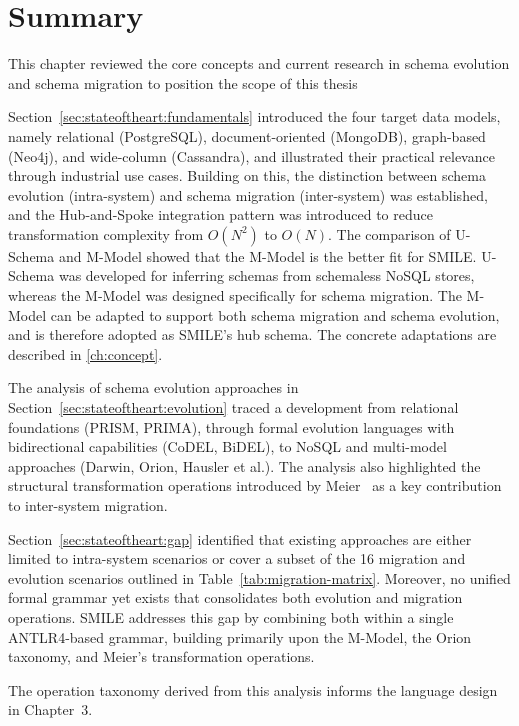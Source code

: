 




\section{Summary}
\label{sec:stateoftheart:summary}

This chapter reviewed the core concepts and current research in schema evolution and schema migration to position the scope of this thesis

Section~\ref{sec:stateoftheart:fundamentals} introduced the four target data models, namely relational (PostgreSQL), document-oriented (MongoDB), graph-based (Neo4j), and wide-column (Cassandra), and illustrated their practical relevance through industrial use cases. Building on this, the distinction between schema evolution (intra-system) and schema migration (inter-system) was established, and the Hub-and-Spoke integration pattern was introduced to reduce transformation complexity from $O(N^2)$ to $O(N)$. The comparison of U-Schema and M-Model showed that the M-Model is the better fit for SMILE. U-Schema was developed for inferring schemas from schemaless NoSQL stores, whereas the M-Model was designed specifically for schema migration. The M-Model can be adapted to support both schema migration and schema evolution, and is therefore adopted as SMILE's hub schema. The concrete adaptations are described in  \autoref{ch:concept}.

The analysis of schema evolution approaches in Section~\ref{sec:stateoftheart:evolution} traced a development from relational foundations (PRISM, PRIMA), through formal evolution languages with bidirectional capabilities (CoDEL, BiDEL), to NoSQL and multi-model approaches (Darwin, Orion, Hausler et al.). The analysis also highlighted the structural transformation operations introduced by Meier~\cite{meier2023datenmigration} as a key contribution to inter-system migration.

Section~\ref{sec:stateoftheart:gap} identified that existing approaches are either limited to intra-system scenarios or cover a subset of the 16 migration and evolution scenarios outlined in Table~\ref{tab:migration-matrix}. Moreover, no unified formal grammar yet exists that consolidates both evolution and migration operations. SMILE  addresses this gap by combining both within a single ANTLR4-based grammar, building primarily upon the M-Model, the Orion taxonomy, and Meier's transformation operations.

The operation taxonomy derived from this analysis informs the language design in Chapter~3.

